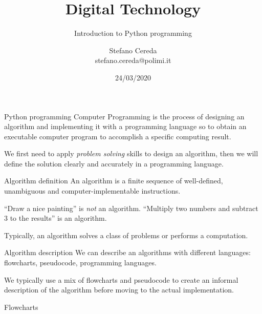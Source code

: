 \documentclass[aspectratio=169,]{beamer}
\title{Digital Technology}
\subtitle{Introduction to Python programming}
\author{Stefano Cereda\\
		stefano.cereda@polimi.it
	}
\date{24/03/2020}
\institute[PoliMi]{Politecnico Milano}
\begin{document}
\begin{frame}
	\maketitle
\end{frame}

\begin{frame}{Python programming}
    Computer Programming is the process of designing an \alert{algorithm} and implementing it with a
    \alert{programming language} so to obtain an executable computer program to accomplish a specific computing result.

    We first need to apply \emph{problem solving} skills to design an algorithm, then we will define the solution
    clearly and accurately in a programming language.
\end{frame}

\begin{frame}{Algorithm definition}
    An algorithm is a \alert{finite sequence of well-defined, unambiguous and computer-implementable instructions}.

    ``Draw a nice painting'' is \emph{not} an algorithm.
    ``Multiply two numbers and subtract 3 to the results'' is an algorithm.

    Typically, an algorithm solves a class of problems or performs a computation.
\end{frame}

\begin{frame}{Algorithm description}
    We can describe an algorithms with different languages: flowcharts, pseudocode, programming languages.

        We typically use a mix of flowcharts and pseudocode to create an \alert{informal} description of the algorithm
        before moving to the actual implementation.
\end{frame}

\begin{frame}{Flowcharts}
\end{frame}
\end{document}
